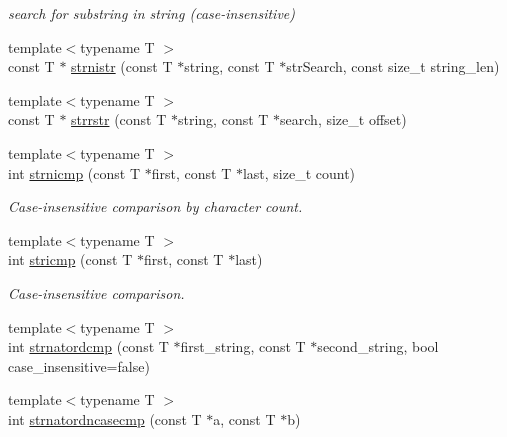 \begin{DoxyCompactItemize}
\begin{DoxyCompactList}\small\item\em search for substring in string (case-\/insensitive) \end{DoxyCompactList}\item 
{\footnotesize template$<$typename T $>$ }\\const T $\ast$ \hyperlink{namespacestring__util_a681a562526aa0d84c5aecc31871d52ac}{strnistr} (const T $\ast$string, const T $\ast$str\-Search, const size\-\_\-t string\-\_\-len)
\item 
{\footnotesize template$<$typename T $>$ }\\const T $\ast$ \hyperlink{namespacestring__util_a9c632047571bec6063ca6316b78baff5}{strrstr} (const T $\ast$string, const T $\ast$search, size\-\_\-t offset)
\item 
\hypertarget{namespacestring__util_ab636487921427be3e286cc5cd46e6cc5}{{\footnotesize template$<$typename T $>$ }\\int \hyperlink{namespacestring__util_ab636487921427be3e286cc5cd46e6cc5}{strnicmp} (const T $\ast$first, const T $\ast$last, size\-\_\-t count)}\label{namespacestring__util_ab636487921427be3e286cc5cd46e6cc5}

\begin{DoxyCompactList}\small\item\em Case-\/insensitive comparison by character count. \end{DoxyCompactList}\item 
\hypertarget{namespacestring__util_a11e8f2f285edc9abd73199db60dc589a}{{\footnotesize template$<$typename T $>$ }\\int \hyperlink{namespacestring__util_a11e8f2f285edc9abd73199db60dc589a}{stricmp} (const T $\ast$first, const T $\ast$last)}\label{namespacestring__util_a11e8f2f285edc9abd73199db60dc589a}

\begin{DoxyCompactList}\small\item\em Case-\/insensitive comparison. \end{DoxyCompactList}\item 
{\footnotesize template$<$typename T $>$ }\\int \hyperlink{namespacestring__util_a2b96d421c7531d6af096e2b6f2b19b6a}{strnatordcmp} (const T $\ast$first\-\_\-string, const T $\ast$second\-\_\-string, bool case\-\_\-insensitive=false)
\item 
\hypertarget{namespacestring__util_abde462ee1fa10e25dee2010cc9b3d500}{{\footnotesize template$<$typename T $>$ }\\int \hyperlink{namespacestring__util_abde462ee1fa10e25dee2010cc9b3d500}{strnatordncasecmp} (const T $\ast$a, const T $\ast$b)}\label{namespacestring__util_abde462ee1fa10e25dee2010cc9b3d500}


\end{DoxyCompactItemize}
